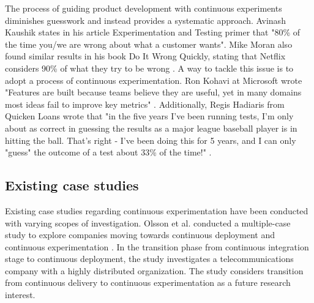 \documentclass[english]{tktltiki2}
\theoremstyle{definition}
\theoremstyle{remark}
\begin{document}
The process of guiding product development with continuous experiments diminishes guesswork and instead provides a systematic approach. Avinash Kaushik states in his article Experimentation and Testing primer \cite{kaushik} that "80\% of the time you/we are wrong about what a customer wants". Mike Moran also found similar results in his book Do It Wrong Quickly, stating that Netflix considers 90\% of what they try to be wrong \cite{moran2007wrong}. A way to tackle this issue is to adopt a process of continuous experimentation. Ron Kohavi at Microsoft wrote "Features are built because teams believe they are useful, yet in many domains most ideas fail to improve key metrics" \cite{kohavi2013online}. Additionally, Regis Hadiaris from Quicken Loans wrote that "in the five years I've been running tests, I'm only about as correct in guessing the results as a major league baseball player is in hitting the ball. That's right - I've been doing this for 5 years, and I can only "guess" the outcome of a test about 33\% of the time!" \cite{moranmultivariate}.


\subsection{Existing case studies}


Existing case studies regarding continuous experimentation have been conducted with varying scopes of investigation. Olsson et al. conducted a multiple-case study to explore companies moving towards continuous deployment and continuous experimentation \cite{olsson2012climbing}. In the transition phase from continuous integration stage to continuous deployment, the study investigates a telecommunications company with a highly distributed organization. The study considers transition from continuous delivery to continuous experimentation as a future research interest. 
\end{document}
